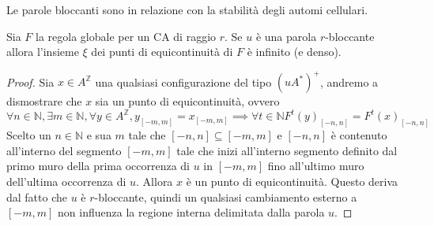 Le parole bloccanti sono in relazione con la stabilità degli automi cellulari.
\begin{teorema}
    Sia $F$ la regola globale per un CA di raggio $r$. Se $u$ è una parola $r$-bloccante
    allora l'insieme $\xi$ dei punti di equicontinuità di $F$ è infinito (e denso).
    \begin{proof}
        Sia $x\in A^\mathbb{Z}$ una qualsiasi configurazione del tipo $(uA^\ast)^+$,
        andremo a dismostrare che $x$ sia un punto di equicontinuità, ovvero 
        $$\forall n\in \mathbb{N} ,\exists m\in \mathbb{N} , \forall y\in A^\mathbb{Z}, y_{[-m,m]} = x_{[-m,m]} \implies \forall t\in \mathbb{N} F^t(y)_{[-n,n]}=F^t(x)_{[-n,n]}$$
        Scelto un $n \in \mathbb{N}$ e sua $m$ tale che $[-n,n]\subseteq [-m,m]$
        e $[-n,n]$ è contenuto all'interno del segmento $[-m,m]$ tale che 
        inizi all'interno segmento definito dal primo muro della prima occorrenza di $u$ in $[-m,m]$ fino 
        all'ultimo muro dell'ultima occorrenza di $u$. Allora $x$ è un punto di 
        equicontinuità. Questo deriva dal fatto che $u$ è $r$-bloccante, quindi un
        qualsiasi cambiamento esterno a $[-m,m]$ non influenza la regione interna
        delimitata dalla parola $u$.
    \end{proof} 
\end{teorema}
